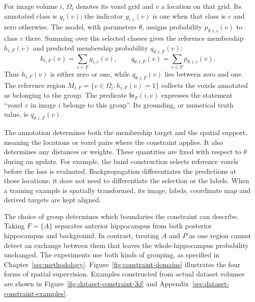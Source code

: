 \documentclass[12pt,a4paper]{article}
\begin{document}
For image volume $i$, $\Omega_i$ denotes its voxel grid and $v$ a location
on that grid. Its annotated class is $y_i(v)$; the indicator $y_{i,c}(v)$
is one when that class is $c$ and zero otherwise. The model, with parameters
$\theta$, assigns probability $p_{\theta,i,c}(v)$ to class $c$ there.
Summing over the selected classes gives the reference membership
$h_{i,F}(v)$ and predicted membership probability $q_{\theta,i,F}(v)$:
\begin{equation}
h_{i,F}(v)=\sum_{c\in F}y_{i,c}(v),
\qquad
q_{\theta,i,F}(v)=\sum_{c\in F}p_{\theta,i,c}(v).
\label{eq:constraint-group-membership}
\end{equation}
Thus $h_{i,F}(v)$ is either zero or one, while $q_{\theta,i,F}(v)$ lies
between zero and one. The reference region
$M_{i,F}=\{v\in\Omega_i:h_{i,F}(v)=1\}$ collects the voxels annotated
as belonging to the group. The predicate $\mathsf{In}_F(i,v)$ expresses
the statement ``voxel $v$ in image $i$ belongs to this group''. Its
grounding, or numerical truth value, is $q_{\theta,i,F}(v)$.

The annotation determines both the membership target and the spatial
support, meaning the locations or voxel pairs where the constraint applies.
It also determines any distances or weights.
These quantities are fixed with respect to $\theta$ during an update.
For example, the band construction selects reference voxels before the
loss is evaluated. Backpropagation differentiates the predictions at those
locations; it does not need to differentiate the selection or the labels.
When a training example is spatially transformed, its image, labels,
coordinate map and derived targets are kept aligned.

The choice of group determines which boundaries the constraint can
describe. Taking $F=\{A\}$ separates anterior hippocampus from both
posterior hippocampus and background. In contrast, treating $A$ and $P$
as one region cannot detect an exchange between them that leaves the
whole-hippocampus probability unchanged. The experiments use both kinds
of grouping, as specified in Chapter~\ref{sec:methodology}.
Figure~\ref{fig:constraint-domains} illustrates the four forms of
spatial supervision. Examples constructed from actual dataset volumes are
shown in Figure~\ref{fig:dataset-constraint-3d} and
Appendix~\ref{sec:dataset-constraint-examples}.
\end{document}
